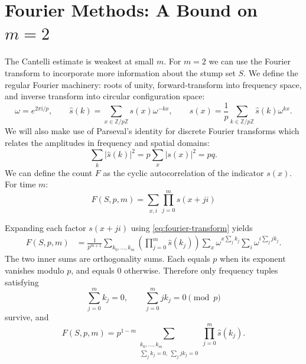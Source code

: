 \documentclass{article}
\begin{document}
\section{Fourier Methods: A Bound on $m=2$}
The Cantelli estimate is weakest at small $m$. For $m=2$ we can use the
Fourier transform to incorporate more information about the stump set $S$.
We define the regular Fourier machinery: roots of unity, forward-transform into frequency space, and inverse transform into circular configuration space:
\begin{equation}
\omega=e^{2\pi\mathrm{i}/p},\qquad
\widehat{s}(k)=\sum_{x\in\mathbb{Z}/p\mathbb{Z}}s(x)\omega^{-kx},
\qquad
s(x)=\frac1p\sum_{k\in\mathbb{Z}/p\mathbb{Z}}
\widehat{s}(k)\omega^{kx}.
\label{eq:fourier-transform}
\end{equation}
We will also make use of Parseval's identity for discrete Fourier transforms which relates the amplitudes in frequency and spatial domains:
\begin{equation}
\sum_k |\widehat{s}(k)|^2 = p \sum_x |s(x)|^2 = pq.
\label{eq:parseval}
\end{equation}
We can define the count $F$ as the cyclic autocorrelation of the indicator $s(x)$. For time $m$: 
\begin{equation}
F(S,p,m)
=\sum_{x,i}\prod_{j=0}^{m}s(x+ji) 
\end{equation}

Expanding each factor $s(x+ji)$ using \eqref{eq:fourier-transform} yields
\begin{align}
F(S,p,m)
&=\frac{1}{p^{m+1}}
  \sum_{k_0,\ldots,k_m}
  \left(\prod_{j=0}^{m}\widehat{s}(k_j)\right)
  \sum_x\omega^{x\sum_jk_j}
  \sum_i\omega^{i\sum_jjk_j}.
\label{eq:fourier-expansion}
\end{align}
The two inner sums are orthogonality sums. Each equals $p$ when
its exponent vanishes modulo $p$, and equals $0$ otherwise. Therefore only
frequency tuples satisfying 
\begin{equation}
\sum_{j=0}^{m}k_j=0,
\qquad
\sum_{j=0}^{m}j k_j=0
\pmod p
\label{eq:fourier-constraints}
\end{equation}
survive, and
\begin{equation}
F(S,p,m)=p^{1-m}
\sum_{\substack{k_0,\ldots,k_m\\
\sum_jk_j=0,\ \sum_jjk_j=0}}
\prod_{j=0}^{m}\widehat{s}(k_j).
\label{eq:fourier-general-count}
\end{equation}
\end{document}
